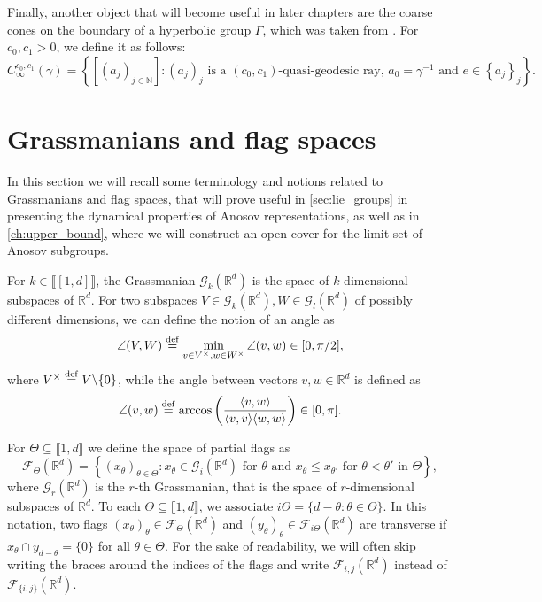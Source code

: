 \documentclass{report}
\begin{document}
Finally, another object that will become useful in later chapters are the coarse cones on the boundary of a hyperbolic group $\Gamma$, which was taken from \cite{pozzetti_anosov_2023}.
For $c_0, c_1 > 0$, we define it as follows:
\[
C_{\infty}^{c_0, c_1}(\gamma) = \left\{ [(a_j)_{j \in \mathbb N}] : (a_j)_j \text{ is a } (c_0,c_1)\text{-quasi-geodesic ray, } a_0 = \gamma^{-1} \text{ and } e \in \left\{ a_j \right\}_{j} \right\}.
\]
\section{Grassmanians and flag spaces}
In this section we will recall some terminology and notions related to Grassmanians and flag spaces, that will prove useful in \cref{sec:lie_groups} in presenting the dynamical properties of Anosov representations, as well as in \cref{ch:upper_bound}, where we will construct an open cover for the limit set of Anosov subgroups.

For $k \in \llbracket [1, d] \rrbracket$, the Grassmanian $\mathcal G_k(\mathbb R^d)$ is the space of $k$-dimensional subspaces of $\mathbb R^d$.
For two subspaces $V \in \mathcal G_k(\mathbb R^d), W \in \mathcal G_l(\mathbb R^d)$ of possibly different dimensions, we can define the notion of an angle as
\[
\angle (V, W) \overset{\mathrm{def}}{=} \min_{v \in V^\times, w \in W^\times} \angle(v,w) \in [0, \pi/2],
\]
where $V^\times \overset{\mathrm{def}}{=} V \backslash \{0\}$, while the angle between vectors $v, w \in \mathbb R^d$ is defined as
\[
\angle(v,w) \overset{\mathrm{def}}{=} \arccos \left( \frac{\langle v,w \rangle}{\langle v, v \rangle \langle w, w \rangle} \right) \in [0, \pi].
\]


For $\Theta \subseteq \llbracket 1, d \rrbracket$ we define the space of partial flags as
$$\mathcal F_\Theta(\mathbb R^d) = \left\{ (x_\theta)_{\theta \in \Theta} : x_\theta \in \mathcal G_i(\mathbb R^d) \text{ for } \theta \text{ and } x_{\theta} \leq x_{\theta'} \text{ for } \theta < \theta' \text{ in } \Theta \right\}, $$
where $\mathcal G_r(\mathbb R^d)$ is the $r$-th Grassmanian, that is the space of $r$-dimensional subspaces of $\mathbb R^d$.
To each $\Theta \subseteq \llbracket 1, d \rrbracket$, we associate $i\Theta = \{ d - \theta : \theta \in \Theta \}$. 
In this notation, two flags $(x_\theta)_\theta \in \mathcal F_\Theta(\mathbb R^d)$ and $(y_{\theta})_\theta \in \mathcal F_{i\Theta}(\mathbb R^d)$ are transverse if $x_\theta \cap y_{d-\theta} = \{0\}$ for all $\theta \in \Theta$.
For the sake of readability, we will often skip writing the braces around the indices of the flags and write $\mathcal F_{i,j}(\mathbb R^d)$ instead of $\mathcal F_{\{i,j\}}(\mathbb R^d)$.
\end{document}
